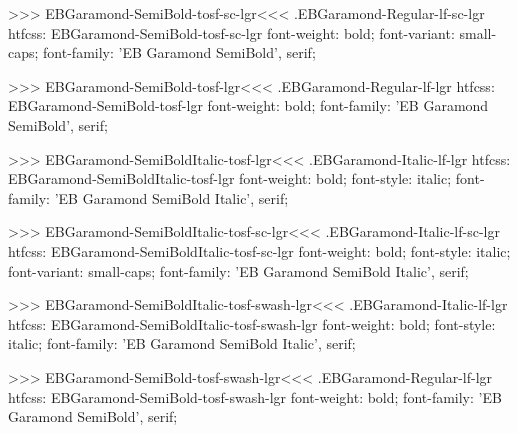 >>>
\<EBGaramond-SemiBold-tosf-sc-lgr\><<<
.EBGaramond-Regular-lf-sc-lgr
htfcss:  EBGaramond-SemiBold-tosf-sc-lgr  font-weight: bold; font-variant: small-caps; font-family: 'EB Garamond SemiBold', serif;

>>>
\<EBGaramond-SemiBold-tosf-lgr\><<<
.EBGaramond-Regular-lf-lgr
htfcss:  EBGaramond-SemiBold-tosf-lgr  font-weight: bold; font-family: 'EB Garamond SemiBold', serif;

>>>
\<EBGaramond-SemiBoldItalic-tosf-lgr\><<<
.EBGaramond-Italic-lf-lgr
htfcss:  EBGaramond-SemiBoldItalic-tosf-lgr  font-weight: bold; font-style: italic; font-family: 'EB Garamond SemiBold Italic', serif;

>>>
\<EBGaramond-SemiBoldItalic-tosf-sc-lgr\><<<
.EBGaramond-Italic-lf-sc-lgr
htfcss:  EBGaramond-SemiBoldItalic-tosf-sc-lgr  font-weight: bold; font-style: italic; font-variant: small-caps; font-family: 'EB Garamond SemiBold Italic', serif;

>>>
\<EBGaramond-SemiBoldItalic-tosf-swash-lgr\><<<
.EBGaramond-Italic-lf-lgr
htfcss:  EBGaramond-SemiBoldItalic-tosf-swash-lgr  font-weight: bold; font-style: italic; font-family: 'EB Garamond SemiBold Italic', serif;

>>>
\<EBGaramond-SemiBold-tosf-swash-lgr\><<<
.EBGaramond-Regular-lf-lgr
htfcss:  EBGaramond-SemiBold-tosf-swash-lgr  font-weight: bold; font-family: 'EB Garamond SemiBold', serif;


